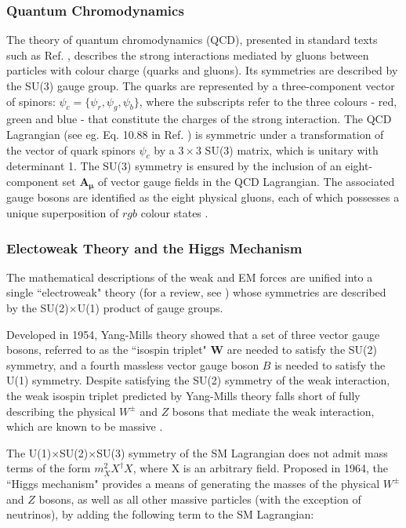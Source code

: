 \subsubsection{Quantum Chromodynamics}

The theory of quantum chromodynamics (QCD), presented in standard texts such as Ref. \cite{qcd_2007}, describes the strong interactions mediated by gluons between particles with colour charge (quarks and gluons). Its symmetries are described by the SU(3) gauge group. The quarks are represented by a three-component vector of spinors: \(\psi_c = \{\psi_r, \psi_g, \psi_b\}\), where the subscripts refer to the three colours - red, green and blue - that constitute the charges of the strong interaction. The QCD Lagrangian (see eg. Eq. 10.88 in Ref. \cite{griffiths_2008}) is symmetric under a transformation of the vector of quark spinors \(\psi_c\) by a \(3\times3\) SU(3) matrix, which is unitary with determinant 1. The SU(3) symmetry is ensured by the inclusion of an eight-component set \(\boldsymbol{\boldsymbol{A}_\mu}\) of vector gauge fields in the QCD Lagrangian. The associated gauge bosons are identified as the eight physical gluons, each of which possesses a unique superposition of \({rgb}\) colour states \cite{griffiths_2008}.

\subsubsection{Electoweak Theory and the Higgs Mechanism}

The mathematical descriptions of the weak and EM forces are unified into a single ``electroweak" theory (for a review, see \cite{electroweak_2012}) whose symmetries are described by the SU(2)\(\times\)U(1) product of gauge groups. 

Developed in 1954, Yang-Mills theory \cite{yang_mills_1954} showed that a set of three vector gauge bosons, referred to as the ``isospin triplet" \(\boldsymbol{W}\) are needed to satisfy the SU(2) symmetry, and a fourth massless vector gauge boson \(B\) is needed to satisfy the U(1) symmetry. Despite satisfying the SU(2) symmetry of the weak interaction, the weak isospin triplet predicted by Yang-Mills theory falls short of fully describing the physical \(W^{\pm}\) and \(Z\) bosons that mediate the weak interaction, which are known to be massive \cite{pdg_2020}.

The U(1)\(\times\)SU(2)\(\times\)SU(3) symmetry of the SM Lagrangian does not admit mass terms of the form \(m_X^2X^\dagger X\), where X is an arbitrary field. Proposed in 1964, the ``Higgs mechanism" \cite{HiggsTheory1,HiggsTheory2,HiggsTheory3} provides a means of generating the masses of the physical \(W^\pm\) and \(Z\) bosons, as well as all other massive particles (with the exception of neutrinos), by adding the following term to the SM Lagrangian:

